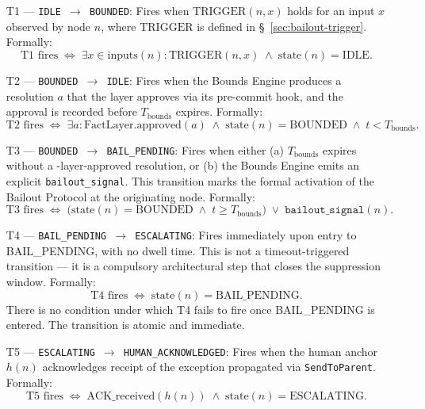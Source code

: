 \begin{enumerate}\itemsep=0pt
\item[T1 --- \texttt{IDLE $\rightarrow$ BOUNDED}:] Fires when $\text{TRIGGER}(n, x)$ holds for an input $x$ observed by node $n$, where $\text{TRIGGER}$ is defined in \S~\ref{sec:bailout-trigger}. Formally:
\begin{equation}
\text{T1 fires} \;\iff\; \exists x \in \text{inputs}(n) : \text{TRIGGER}(n, x) \;\land\; \text{state}(n) = \text{IDLE}. \tag{T1}
\end{equation}

\item[T2 --- \texttt{BOUNDED $\rightarrow$ IDLE}:] Fires when the Bounds Engine produces a resolution $a$ that the \fact{} layer approves via its pre-commit hook, and the approval is recorded before $T_{\text{bounds}}$ expires. Formally:
\begin{equation}
\text{T2 fires} \;\iff\; \exists a : \text{FactLayer.approved}(a) \;\land\; \text{state}(n) = \text{BOUNDED} \;\land\; t < T_{\text{bounds}}. \tag{T2}
\end{equation}

\item[T3 --- \texttt{BOUNDED $\rightarrow$ BAIL\_PENDING}:] Fires when either (a) $T_{\text{bounds}}$ expires without a \fact-layer-approved resolution, or (b) the Bounds Engine emits an explicit \texttt{bailout\_signal}. This transition marks the formal activation of the Bailout Protocol at the originating node. Formally:
\begin{equation}
\text{T3 fires} \;\iff\; \bigl(\text{state}(n) = \text{BOUNDED} \;\land\; t \geq T_{\text{bounds}}\bigr) \;\lor\; \texttt{bailout\_signal}(n). \tag{T3}
\end{equation}

\item[T4 --- \texttt{BAIL\_PENDING $\rightarrow$ ESCALATING}:] Fires immediately upon entry to BAIL\_PENDING, with no dwell time. This is not a timeout-triggered transition --- it is a compulsory architectural step that closes the suppression window. Formally:
\begin{equation}
\text{T4 fires} \;\iff\; \text{state}(n) = \text{BAIL\_PENDING}. \tag{T4}
\end{equation}
There is no condition under which T4 fails to fire once BAIL\_PENDING is entered. The transition is atomic and immediate.

\item[T5 --- \texttt{ESCALATING $\rightarrow$ HUMAN\_ACKNOWLEDGED}:] Fires when the human anchor $h(n)$ acknowledges receipt of the exception propagated via \texttt{SendToParent}. Formally:
\begin{equation}
\text{T5 fires} \;\iff\; \text{ACK\_received}(h(n)) \;\land\; \text{state}(n) = \text{ESCALATING}. \tag{T5}
\end{equation}


\end{enumerate}
